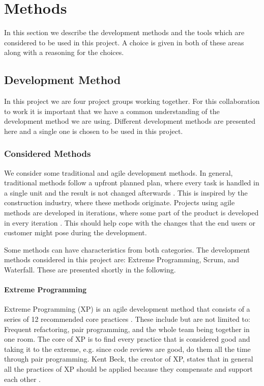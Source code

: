 \section{Methods}
In this section we describe the development methods and the tools which are considered to be used in this project.
A choice is given in both of these areas along with a reasoning for the choices.

\subsection{Development Method}
In this project we are four project groups working together.
For this collaboration to work it is important that we have a common understanding of the development method we are using.
Different development methods are presented here and a single one is chosen to be used in this project.

\subsubsection{Considered Methods}
We consider some traditional and agile development methods. 
In general, traditional methods follow a upfront planned plan, where every task is handled in a single unit and the result is not changed afterwards \cite[sec.~2.7]{Poppendieck00}.
This is inspired by the construction industry, where these methods originate.
Projects using agile methods are developed in iterations, where some part of the product is developed in every iteration \cite[p.~25]{Larman04}.
This should help cope with the changes that the end users or customer might pose during the development.

Some methods can have characteristics from both categories.
The development methods considered in this project are: Extreme Programming, Scrum, and Waterfall.
These are presented shortly in the following.

\paragraph{Extreme Programming}
Extreme Programming (XP) is an agile development method that consists of a series of 12 recommended core practices \cite[p.~137]{Larman04}.
These include but are not limited to: Frequent refactoring, pair programming, and the whole team being together in one room.
The core of XP is to find every practice that is considered good and taking it to the extreme, e.g. since code reviews are good, do them all the time through pair programming.
Kent Beck, the creator of XP, states that in general all the practices of XP should be applied because they compensate and support each other \cite[p.~156-157]{Larman04}.


